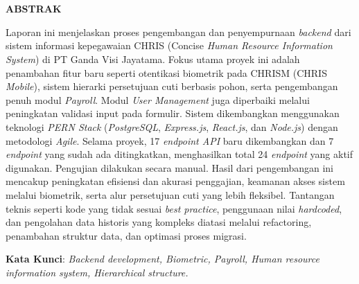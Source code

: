 \chapter*{\Judul}
\singlespacing
\begin{center}
    
    \vspace{-4em}
    
    \penulis
    
	\bigskip
    
    \textbf{ABSTRAK}
    
\end{center}


\vspace*{0.2cm}
{
	\setlength{\parindent}{0pt}

	\bigskip
	\bigskip

	Laporan ini menjelaskan proses pengembangan dan penyempurnaan \textit{backend} dari sistem informasi kepegawaian CHRIS (Concise \textit{Human Resource Information System}) di PT Ganda Visi Jayatama. Fokus utama proyek ini adalah penambahan fitur baru seperti otentikasi biometrik pada CHRISM (CHRIS \textit{Mobile}), sistem hierarki persetujuan cuti berbasis pohon, serta pengembangan penuh modul \textit{Payroll}. Modul \textit{User Management} juga diperbaiki melalui peningkatan validasi input pada formulir. Sistem dikembangkan menggunakan teknologi \textit{PERN Stack} (\textit{PostgreSQL}, \textit{Express.js}, \textit{React.js}, dan \textit{Node.js}) dengan metodologi \textit{Agile}. Selama proyek, 17 \textit{endpoint API} baru dikembangkan dan 7 \textit{endpoint} yang sudah ada ditingkatkan, menghasilkan total 24 \textit{endpoint} yang aktif digunakan. Pengujian dilakukan secara manual. Hasil dari pengembangan ini mencakup peningkatan efisiensi dan akurasi penggajian, keamanan akses sistem melalui biometrik, serta alur persetujuan cuti yang lebih fleksibel. Tantangan teknis seperti kode yang tidak sesuai \textit{best practice}, penggunaan nilai \textit{hardcoded}, dan pengolahan data historis yang kompleks diatasi melalui refactoring, penambahan struktur data, dan optimasi proses migrasi.

	\bigskip
 
	\textbf{Kata Kunci}: \textit{Backend development, Biometric, Payroll, Human resource information system, Hierarchical structure.}	
}

\onehalfspacing